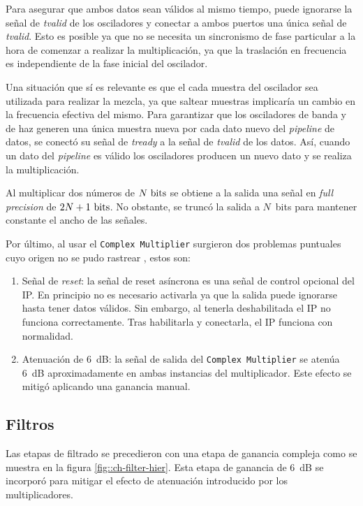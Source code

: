 \documentclass[../../main.tex]{subfiles}
\begin{document}
Para asegurar que ambos datos sean válidos al mismo tiempo, puede ignorarse la señal de \textit{tvalid} de los osciladores y conectar a ambos puertos una única señal de \textit{tvalid}. Esto es posible ya que no se necesita un sincronismo de fase particular a la hora de comenzar a realizar la multiplicación, ya que la traslación en frecuencia es independiente de la fase inicial del oscilador. 

Una situación que sí es relevante es que el cada muestra del oscilador sea utilizada para realizar la mezcla, ya que saltear muestras implicaría un cambio en la frecuencia efectiva del mismo. 
Para garantizar que los osciladores de banda y de haz generen una única muestra nueva por cada dato nuevo del \textit{pipeline} de datos, se conectó su señal de \textit{tready} a la señal de \textit{tvalid} de los datos. Así, cuando un dato del \textit{pipeline} es válido los osciladores producen un nuevo dato y se realiza la multiplicación.

Al multiplicar dos números de $N~\textrm{bits}$ se obtiene a la salida una señal en \textit{full precision} de $2 N + 1~\textrm{bits}$. No obstante, se truncó la salida a $N$~bits para mantener constante el ancho de las señales.

Por último, al usar el \texttt{Complex Multiplier} surgieron dos problemas puntuales cuyo origen no se pudo rastrear , estos son:
\begin{enumerate}
    \item Señal de \textit{reset}: la señal de reset asíncrona es una señal de control opcional del IP. En principio no es necesario activarla ya que la salida puede ignorarse hasta tener datos válidos. Sin embargo, al tenerla deshabilitada el IP no funciona correctamente. Tras habilitarla y conectarla, el IP funciona con normalidad.
    \item Atenuación de 6~dB: la señal de salida del \texttt{Complex Multiplier} se atenúa 6~dB aproximadamente en ambas instancias del multiplicador. Este efecto se mitigó aplicando una ganancia manual.
\end{enumerate}

\subsection{Filtros}
Las etapas de filtrado se precedieron con una etapa de ganancia compleja como se muestra en la figura \ref{fig::ch-filter-hier}. Esta etapa de ganancia de 6~dB se incorporó para mitigar el efecto de atenuación introducido por los multiplicadores.
\end{document}
